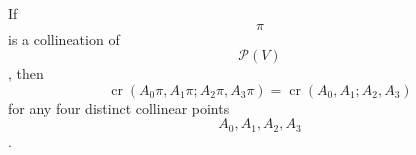 If $$\pi$$ is a collineation of $$\mathcal{P}(V)$$, then
$$\operatorname{cr}(A_0\pi, A_1\pi; A_2\pi, A_3\pi) = \operatorname{cr}(A_0, A_1; A_2, A_3)$$
for any four distinct collinear points $$A_0, A_1, A_2, A_3$$.

